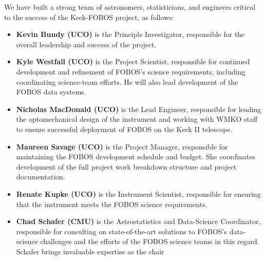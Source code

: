 \documentclass[oneside,11pt]{amsart}
\begin{document}


\begin{center}
\end{center}

\smallskip

\noindent We have built a strong team of astronomers, statisticians, and
engineers critical to the success of the Keck-FOBOS project, as follows:
%
\begin{itemize}
%
\item {\bf Kevin Bundy (UCO)} is the Principle Investigator, responsible
for the overall leadership and success of the project.\\[-5pt]
%
\item {\bf Kyle Westfall (UCO)} is the Project Scientist, responsible
for continued development and refinement of FOBOS's science
requirements, including coordinating science-team efforts.  He will also
lead development of the FOBOS data systems.\\[-5pt]
%
\item {\bf Nicholas MacDonald (UCO)} is the Lead Engineer, responsible
for leading the optomechanical design of the instrument and working with
WMKO staff to ensure successful deployment of FOBOS on the Keck II
telescope.\\[-5pt]
%
\item {\bf Maureen Savage (UCO)} is the Project Manager, responsible for
maintaining the FOBOS development schedule and budget.  She coordinates
development of the full project work breakdown structure and project
documentation.\\[-5pt]
%
\item {\bf Renate Kupke (UCO)} is the Instrument Scientist, responsible
for ensuring that the instrument meets the FOBOS science
requirements.\\[-5pt]
%
\item {\bf Chad Schafer (CMU)} is the Astrostatistics and Data-Science
Coordinator, responsible for consulting on state-of-the-art solutions to
FOBOS's data-science challenges and the efforts of the FOBOS science
teams in this regard.  Schafer brings invaluable expertise as the chair

\end{itemize}
\end{document}
